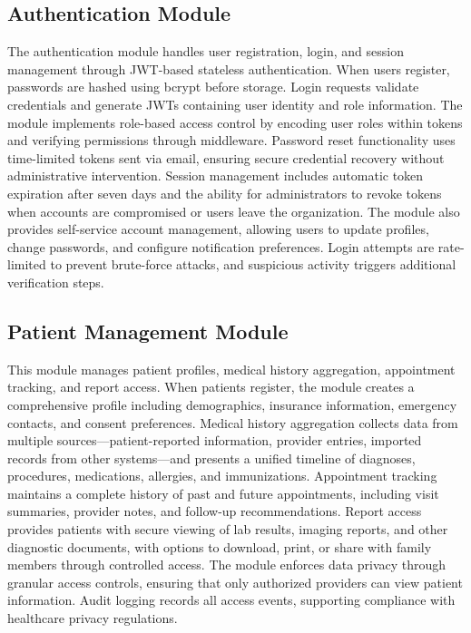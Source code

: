 \subsection{Authentication Module}

\justifying
\noindent The authentication module handles user registration, login, and session management through JWT-based stateless authentication. When users register, passwords are hashed using bcrypt before storage. Login requests validate credentials and generate JWTs containing user identity and role information. The module implements role-based access control by encoding user roles within tokens and verifying permissions through middleware. Password reset functionality uses time-limited tokens sent via email, ensuring secure credential recovery without administrative intervention. Session management includes automatic token expiration after seven days and the ability for administrators to revoke tokens when accounts are compromised or users leave the organization. The module also provides self-service account management, allowing users to update profiles, change passwords, and configure notification preferences. Login attempts are rate-limited to prevent brute-force attacks, and suspicious activity triggers additional verification steps.

\subsection{Patient Management Module}

\justifying
\noindent This module manages patient profiles, medical history aggregation, appointment tracking, and report access. When patients register, the module creates a comprehensive profile including demographics, insurance information, emergency contacts, and consent preferences. Medical history aggregation collects data from multiple sources—patient-reported information, provider entries, imported records from other systems—and presents a unified timeline of diagnoses, procedures, medications, allergies, and immunizations. Appointment tracking maintains a complete history of past and future appointments, including visit summaries, provider notes, and follow-up recommendations. Report access provides patients with secure viewing of lab results, imaging reports, and other diagnostic documents, with options to download, print, or share with family members through controlled access. The module enforces data privacy through granular access controls, ensuring that only authorized providers can view patient information. Audit logging records all access events, supporting compliance with healthcare privacy regulations.

